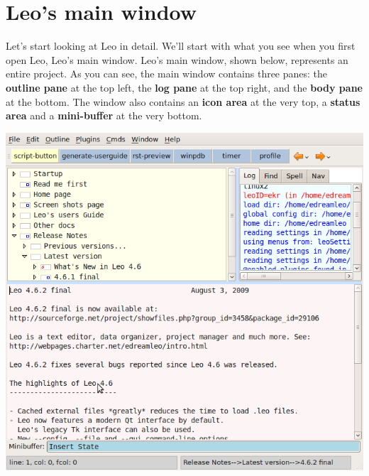 \documentclass[a4paper,10pt,english]{sphinxmanual}
\begin{document}
\section{Leo's main window}
\label{intro:leo-s-main-window}
Let's start looking at Leo in detail. We'll start with what you see when you
first open Leo, Leo's main window. Leo's main window, shown below, represents an
entire project. As you can see, the main window contains three panes: the
\textbf{outline pane} at the top left, the \textbf{log pane} at the top right, and the
\textbf{body pane} at the bottom. The window also contains an \textbf{icon area} at the
very top, a \textbf{status area} and a \textbf{mini-buffer} at the very bottom.

\includegraphics{leo-qt-main-window.png}
\end{document}
